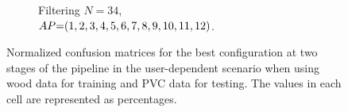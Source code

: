 \begin{figure}[ht]
\begin{subfigure}{.49\textwidth}
        \vspace{-15pt}
        \captionsetup{width=.99\linewidth}
        \caption{Filtering $N{=}34$, \\ $\splitatcommas{AP{=}(1, 2, 3, 4, 5, 6, 7, 8, 9, 10, 11, 12)}$.}
        \label{fig:radar-experiments:through-materials:wood-pvc-confusion:filtering-ud}
    \end{subfigure}
    
    \caption{Normalized confusion matrices for the best configuration at two stages of the pipeline in the user-dependent scenario when using wood data for training and PVC data for testing. The values in each cell are represented as percentages.}
    \label{fig:radar-experiments:through-materials:wood-pvc-confusion}
\end{figure}








